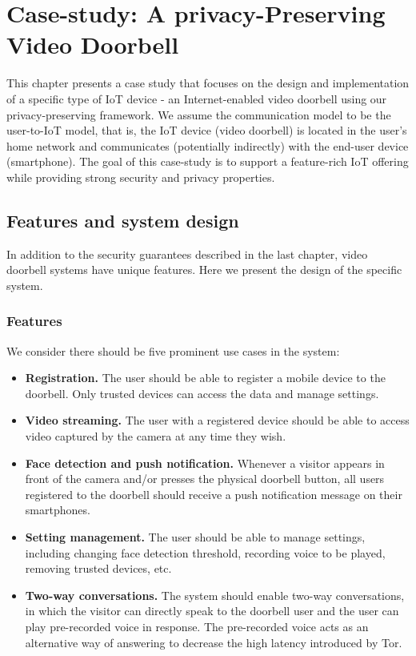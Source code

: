 \chapter{Case-study: A privacy-Preserving Video Doorbell}
\label{sec:case_study}
This chapter presents a case study that focuses on the design and implementation of a specific type of IoT device - an Internet-enabled video doorbell using our privacy-preserving framework. We assume the communication model to be the user-to-IoT model, that is,  the IoT device (video doorbell) is located in the user’s home network and communicates (potentially indirectly) with the end-user device (smartphone). The goal of this case-study is to support a feature-rich IoT offering while providing strong security and privacy properties.

\section{Features and system design}
In addition to the security guarantees described in the last chapter, video doorbell systems have unique features. Here we present the design of the specific system.

\subsection{Features}
We consider there should be five prominent use cases in the system:
\begin{itemize}
	\item \textbf{Registration.} The user should be able to register a mobile device to the doorbell. Only trusted devices can access the data and manage settings.
	\item \textbf{Video streaming.} The user with a registered device should be able to access video captured by the camera at any time they wish.
	\item \textbf{Face detection and push notification.} Whenever a visitor appears in front of the camera and/or presses the physical doorbell button, all users registered to the doorbell should receive a push notification message on their smartphones.
	\item \textbf{Setting management.} The user should be able to manage settings, including changing face detection threshold, recording voice to be played, removing trusted devices, etc.
	\item \textbf{Two-way conversations.} The system should enable two-way conversations, in which the visitor can directly speak to the doorbell user and the user can play pre-recorded voice in response. The pre-recorded voice acts as an alternative way of answering to decrease the high latency introduced by Tor.
\end{itemize}

